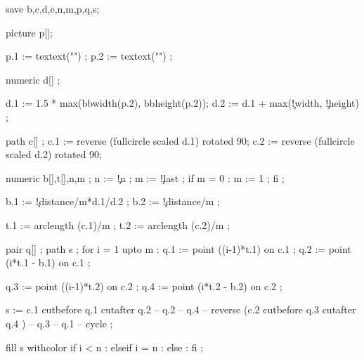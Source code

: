 


  save b,c,d,e,n,m,p,q,s;

  picture p[]; 
  
  p.1 := textext("\getvisualcountertext") ;
  p.2 := textext("\getmaxvisualcountertext") ;

  numeric d[] ;

  d.1 := 1.5 * max(bbwidth(p.2), bbheight(p.2));
  d.2 := d.1 + max(\visualcounterparameter\c!width, 
                   \visualcounterparameter\c!height) ;

  path c[] ;
  c.1 := reverse (fullcircle scaled d.1) rotated 90;
  c.2 := reverse (fullcircle scaled d.2) rotated 90;

  numeric b[],t[],n,m ;
  n := \visualcounterparameter\c!n ;
  m := \visualcounterparameter\c!last ;
  if m = 0 : m := 1 ; fi ;

  b.1 := \visualcounterparameter\c!distance/m*d.1/d.2 ;
  b.2 := \visualcounterparameter\c!distance/m ;

  t.1 := arclength (c.1)/m ;
  t.2 := arclength (c.2)/m ;

  pair q[] ;
  path s ;
  for i = 1 upto m : 
    q.1 := point ((i-1)*t.1)        on c.1 ;
    q.2 := point (i*t.1 - b.1)  on c.1 ;

    q.3 := point ((i-1)*t.2)        on c.2 ;
    q.4 := point (i*t.2 - b.2)  on c.2 ;

    s := c.1 cutbefore q.1 cutafter q.2 -- q.2 -- q.4
       -- reverse (c.2 cutbefore q.3 cutafter q.4 ) -- q.3 -- q.1 
       -- cycle ;

    fill s withcolor 
      if i < n     :  
      elseif i = n : 
      else         : 
      fi ;

